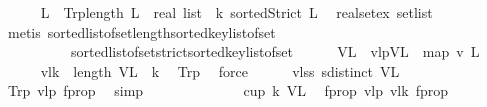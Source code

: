 \begin{isabellebody}
\ \ \ \ \isamarkupfalse%
\ L\ \ Trp{\isacharcolon}{\kern0pt}{\isachardoublequoteopen}length\ {\isacharparenleft}{\kern0pt}L\ {\isacharcolon}{\kern0pt}{\isacharcolon}{\kern0pt}\ real\ list{\isacharparenright}{\kern0pt}\ {\isacharequal}{\kern0pt}\ k{\isachardoublequoteclose}\ {\isachardoublequoteopen}sortedStrict\ L{\isachardoublequoteclose}\ \isamarkupfalse%
\ real{\isacharunderscore}{\kern0pt}set{\isacharunderscore}{\kern0pt}ex\ set{}list\isanewline
\ \ \ \ \ \ \isamarkupfalse%
\ {\isacharparenleft}{\kern0pt}metis\ sorted{\isacharunderscore}{\kern0pt}list{\isacharunderscore}{\kern0pt}of{\isacharunderscore}{\kern0pt}set{\isachardot}{\kern0pt}length{\isacharunderscore}{\kern0pt}sorted{\isacharunderscore}{\kern0pt}key{\isacharunderscore}{\kern0pt}list{\isacharunderscore}{\kern0pt}of{\isacharunderscore}{\kern0pt}set\isanewline
\ \ \ \ \ \ \ \ \ \ sorted{\isacharunderscore}{\kern0pt}list{\isacharunderscore}{\kern0pt}of{\isacharunderscore}{\kern0pt}set{\isachardot}{\kern0pt}strict{\isacharunderscore}{\kern0pt}sorted{\isacharunderscore}{\kern0pt}key{\isacharunderscore}{\kern0pt}list{\isacharunderscore}{\kern0pt}of{\isacharunderscore}{\kern0pt}set{\isacharparenright}{\kern0pt}\isanewline
\ \ \ \ \isamarkupfalse%
\ V{}L\ \ v{}lp{\isacharcolon}{\kern0pt}{\isachardoublequoteopen}V{}L\ {\isacharequal}{\kern0pt}\ map\ v{}\ L{\isachardoublequoteclose}\isanewline
\ \ \ \ \isamarkupfalse%
\ v{}l{\isacharunderscore}{\kern0pt}k{\isacharcolon}{\kern0pt}\ \ {\isachardoublequoteopen}length\ V{}L\ {\isacharequal}{\kern0pt}\ k{\isachardoublequoteclose}\ \isamarkupfalse%
\ Trp\ \isamarkupfalse%
\ force\isanewline
\ \ \ \ \isamarkupfalse%
\ v{}l{\isacharunderscore}{\kern0pt}ss{\isacharcolon}{\kern0pt}\ {\isachardoublequoteopen}sdistinct\ V{}L{\isachardoublequoteclose}\ \isamarkupfalse%
\ Trp{\isacharparenleft}{\kern0pt}{}{\isacharparenright}{\kern0pt}\ v{}lp\ f{\isacharunderscore}{\kern0pt}prop{}{}\ \isamarkupfalse%
\ simp\isanewline
\ \ \ \ \isamarkupfalse%
\ \ \ \ \ \ \ \ \ {\isachardoublequoteopen}cup\ k\ V{}L{\isachardoublequoteclose}\ \isamarkupfalse%
\ f{\isacharunderscore}{\kern0pt}prop{}\ v{}lp\ v{}l{\isacharunderscore}{\kern0pt}k\ f{\isacharunderscore}{\kern0pt}prop{}{}\ \isamarkupfalse%

\end{isabellebody}
